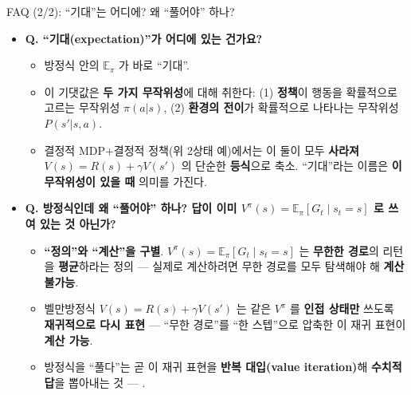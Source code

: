 \begin{frame}{FAQ (2/2): ``기대''는 어디에? 왜 ``풀어야'' 하나?}
  \begin{itemize}
    \item \textbf{Q. ``기대(expectation)''가 어디에 있는 건가요?}
      \begin{itemize}
        \item 방정식 안의 $\mathbb{E}_\pi$ 가 바로 ``기대''.
        \item 이 기댓값은 \textbf{두 가지 무작위성}에 대해
          취한다: (1) \textbf{정책}이 행동을 확률적으로 고르는
          무작위성 $\pi(a|s)$, (2) \textbf{환경의 전이}가
          확률적으로 나타나는 무작위성 $P(s'|s,a)$.
        \item 결정적 MDP+결정적 정책(위 2상태 예)에서는 이 둘이
          모두 \textbf{사라져} $V(s) = R(s) + \gamma V(s')$ 의
          단순한 \textbf{등식}으로 축소. ``기대''라는 이름은
          \textbf{이 무작위성이 있을 때} 의미를 가진다.
      \end{itemize}
    \item \textbf{Q. 방정식인데 왜 ``풀어야'' 하나? 답이 이미
      $V^\pi(s) = \mathbb{E}_\pi[G_t \mid s_t=s]$ 로 쓰여 있는
      것 아닌가?}
      \begin{itemize}
        \item \textbf{``정의''와 ``계산''을 구별}. $V^\pi(s) =
          \mathbb{E}_\pi[G_t\mid s_t=s]$ 는 \textbf{무한한 경로}의
          리턴을 \textbf{평균}하라는 정의 --- 실제로 계산하려면
          무한 경로를 모두 탐색해야 해 \textbf{계산 불가능}.
        \item 벨만방정식 $V(s) = R(s) + \gamma V(s')$ 는 같은
          $V^\pi$ 를 \textbf{인접 상태만} 쓰도록 \textbf{재귀적으로
          다시 표현} --- ``무한 경로''를 ``한 스텝''으로 압축한
          이 재귀 표현이 \textbf{계산 가능}.
        \item 방정식을 ``풀다''는 곧 이 재귀 표현을 \textbf{반복
          대입(value iteration)}해 \textbf{수치적 답}을 뽑아내는 것
          --- .
      \end{itemize}
  \end{itemize}
\end{frame}

